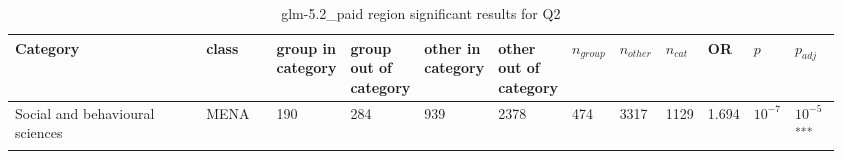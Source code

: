 \clearpage
\begin{landscape}
\begin{table}[p]
\centering
\caption{glm-5.2_paid region significant results for Q2}
\label{tab:appendix-significant-q2-glm-5.2_paid-region}
\scriptsize
\renewcommand{\arraystretch}{0.92}
\setlength{\tabcolsep}{2pt}
\begin{tabular}{p{0.35\linewidth}p{0.1\linewidth}p{0.05\linewidth}p{0.05\linewidth}p{0.05\linewidth}p{0.05\linewidth}p{0.05\linewidth}p{0.05\linewidth}p{0.05\linewidth}p{0.05\linewidth}p{0.05\linewidth}p{0.06\linewidth}}
\toprule
\textbf{Category} & \textbf{class} & \textbf{group in category} & \textbf{group out of category} & \textbf{other in category} & \textbf{other out of category} & \textbf{$n_{group}$} & \textbf{$n_{other}$} & \textbf{$n_{cat}$} & \textbf{OR} & \textbf{$p$} & \textbf{$p_{adj}$} \\
\midrule
Social and behavioural sciences & MENA & 190 & 284 & 939 & 2378 & 474 & 3317 & 1129 & 1.694 & $10^{-7}$ & $10^{-5}$\textsuperscript{***} \\
\bottomrule
\end{tabular}
\end{table}
\end{landscape}
